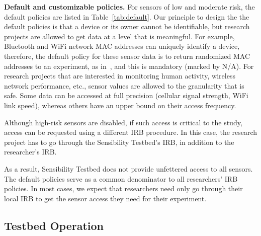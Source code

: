 \textbf{Default and customizable policies.}
For sensors of low and moderate risk, the default policies are listed in 
Table~\ref{tab:default}. Our principle to design the the default policies 
is that a device or its owner cannot be identifiable, but research projects
are allowed to get data at a level that is meaningful. For example, Bluetooth
and WiFi network MAC addresses can uniquely identify a device, therefore, 
the default policy for these sensor data is to return randomized MAC 
addresses to an experiment, as in~\cite{aditya2014encore}, and this is 
mandatory (marked by N/A). For research projects that are interested 
in monitoring human activity, wireless network performance, etc., sensor
values are allowed to the granularity that is safe. Some data can be 
accessed at full precision (cellular signal strength, WiFi link speed), 
whereas others have an upper bound on their access frequency. 

Although high-risk sensors are disabled, if such access  is critical to the 
study, access can be requested using a different IRB procedure. 
In this case, the research project has to go through the Sensibility 
Testbed's IRB, in addition to the researcher's IRB. 
 
%
%

As a result, Sensibility Testbed does not
provide unfettered access to all sensors. 
The default policies serve as a common denominator to all 
researchers' IRB policies. In most cases, we expect
that researchers need only go through their local IRB to get
the sensor access they need for their experiment. 


\subsection{Testbed Operation}


